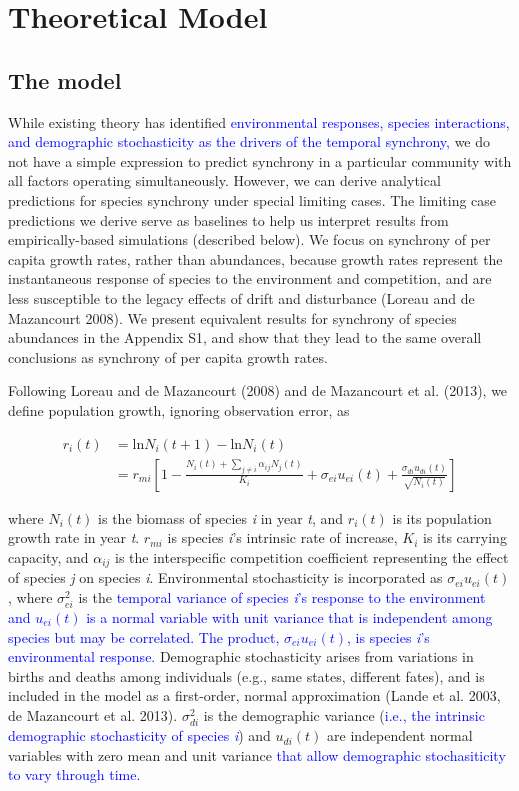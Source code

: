 \documentclass[11pt,]{article}
\begin{document}
\section{Theoretical Model}\subsection{The model}

While existing theory has identified
\textcolor{blue}{environmental responses, species interactions, and demographic stochasticity as the drivers of the temporal synchrony,}
we do not have a simple expression to predict synchrony in a particular
community with all factors operating simultaneously. However, we can
derive analytical predictions for species synchrony under special
limiting cases. The limiting case predictions we derive serve as
baselines to help us interpret results from empirically-based
simulations (described below). We focus on synchrony of per capita
growth rates, rather than abundances, because growth rates represent the
instantaneous response of species to the environment and competition,
and are less susceptible to the legacy effects of drift and disturbance
(Loreau and {{de Mazancourt}} 2008). We present equivalent results for
synchrony of species abundances in the Appendix S1, and show that they
lead to the same overall conclusions as synchrony of per capita growth
rates.

Following Loreau and {{de Mazancourt}} (2008) and {{de Mazancourt}} et
al. (2013), we define population growth, ignoring observation error, as

\begin{align}
r_i(t) &= \text{ln}N_i(t+1) - \text{ln}N_i(t) \\
&= r_{mi} \left[ 1- \frac{N_i(t)+\sum_{j \neq i} \alpha_{ij}N_j(t)} {K_i} + \sigma_{ei}u_{ei}(t) + \frac{\sigma_{di}u_{di}(t)}{\sqrt{N_i(t)}} \right]
\end{align}

\noindent where \(N_i(t)\) is the biomass of species \emph{i} in year
\emph{t}, and \(r_i(t)\) is its population growth rate in year \emph{t}.
\(r_{mi}\) is species \emph{i}'s intrinsic rate of increase, \(K_i\) is
its carrying capacity, and \(\alpha_{ij}\) is the interspecific
competition coefficient representing the effect of species \emph{j} on
species \emph{i}. Environmental stochasticity is incorporated as
\(\sigma_{ei}u_{ei}(t)\), where \(\sigma_{ei}^2\) is the
\textcolor{blue}{temporal variance of species \emph{i}'s response to the environment and $u_{ei}(t)$ is a normal variable with unit variance that is independent among species but may be correlated.}
\textcolor{blue}{The product, $\sigma_{ei}u_{ei}(t)$, is species \emph{i}'s environmental response.}
Demographic stochasticity arises from variations in births and deaths
among individuals (e.g., same states, different fates), and is included
in the model as a first-order, normal approximation (Lande et al. 2003,
{{de Mazancourt}} et al. 2013). \(\sigma_{di}^2\) is the demographic
variance
(\textcolor{blue}{i.e., the intrinsic demographic stochasticity of species \emph{i}})
and \(u_{di}(t)\) are independent normal variables with zero mean and
unit variance
\textcolor{blue}{that allow demographic stochasiticity to vary through time.}
\end{document}

